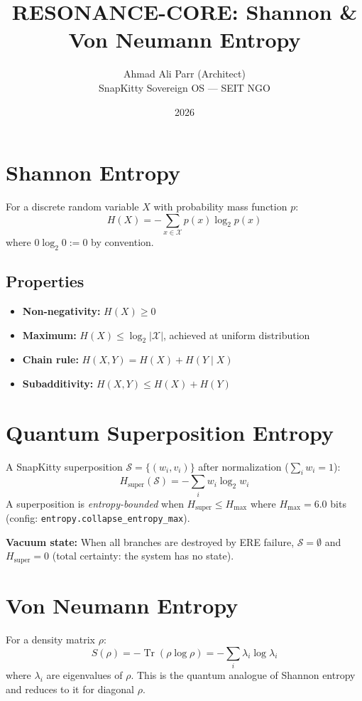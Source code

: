 \documentclass{article}
\title{RESONANCE-CORE: Shannon \& Von Neumann Entropy}
\author{Ahmad Ali Parr (Architect) \\ SnapKitty Sovereign OS --- SEIT NGO}
\date{2026}
\begin{document}
\maketitle

\section{Shannon Entropy}
For a discrete random variable $X$ with probability mass function $p$:
\begin{equation}
  H(X) = -\sum_{x \in \mathcal{X}} p(x) \log_2 p(x)
\end{equation}
where $0 \log_2 0 := 0$ by convention.

\subsection{Properties}
\begin{itemize}
  \item \textbf{Non-negativity:} $H(X) \geq 0$
  \item \textbf{Maximum:} $H(X) \leq \log_2 |\mathcal{X}|$, achieved at uniform distribution
  \item \textbf{Chain rule:} $H(X, Y) = H(X) + H(Y \mid X)$
  \item \textbf{Subadditivity:} $H(X, Y) \leq H(X) + H(Y)$
\end{itemize}

\section{Quantum Superposition Entropy}
A SnapKitty superposition $\mathcal{S} = \{(w_i, v_i)\}$ after normalization ($\sum_i w_i = 1$):
\begin{equation}
  H_{\text{super}}(\mathcal{S}) = -\sum_{i} w_i \log_2 w_i
\end{equation}
A superposition is \emph{entropy-bounded} when $H_{\text{super}} \leq H_{\max}$ where $H_{\max} = 6.0$ bits (config: \texttt{entropy.collapse\_entropy\_max}).

\textbf{Vacuum state:} When all branches are destroyed by ERE failure, $\mathcal{S} = \emptyset$ and $H_{\text{super}} = 0$ (total certainty: the system has no state).

\section{Von Neumann Entropy}
For a density matrix $\rho$:
\begin{equation}
  S(\rho) = -\operatorname{Tr}(\rho \log \rho) = -\sum_i \lambda_i \log \lambda_i
\end{equation}
where $\lambda_i$ are eigenvalues of $\rho$. This is the quantum analogue of Shannon entropy and reduces to it for diagonal $\rho$.
\end{document}
